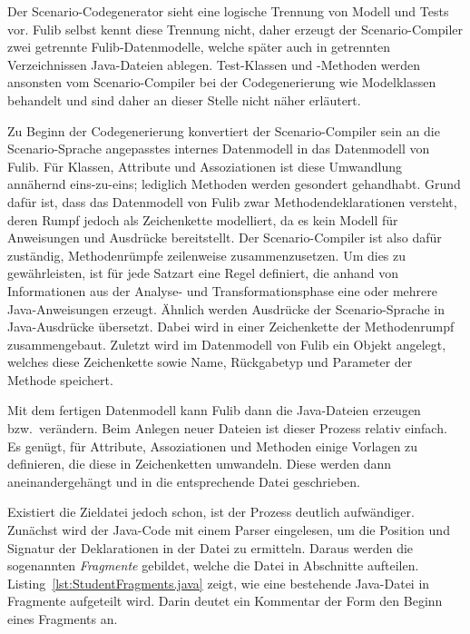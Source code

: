 Der Scenario-Codegenerator sieht eine logische Trennung von Modell und Tests vor.
Fulib selbst kennt diese Trennung nicht, daher erzeugt der Scenario-Compiler zwei getrennte Fulib-Datenmodelle, welche später auch in getrennten Verzeichnissen Java-Dateien ablegen.
Test-Klassen und -Methoden werden ansonsten vom Scenario-Compiler bei der Codegenerierung wie Modelklassen behandelt und sind daher an dieser Stelle nicht näher erläutert.

Zu Beginn der Codegenerierung konvertiert der Scenario-Compiler sein an die Scenario-Sprache angepasstes internes Datenmodell in das Datenmodell von Fulib.
Für Klassen, Attribute und Assoziationen ist diese Umwandlung annähernd eins-zu-eins;
lediglich Methoden werden gesondert gehandhabt.
Grund dafür ist, dass das Datenmodell von Fulib zwar Methodendeklarationen versteht,
deren Rumpf jedoch als Zeichenkette modelliert,
da es kein Modell für Anweisungen und Ausdrücke bereitstellt.
Der Scenario-Compiler ist also dafür zuständig, Methodenrümpfe zeilenweise zusammenzusetzen.
Um dies zu gewährleisten, ist für jede Satzart eine Regel definiert, die anhand von Informationen aus der Analyse- und Transformationsphase eine oder mehrere Java-Anweisungen erzeugt.
Ähnlich werden Ausdrücke der Scenario-Sprache in Java-Ausdrücke übersetzt.
Dabei wird in einer Zeichenkette der Methodenrumpf zusammengebaut.
Zuletzt wird im Datenmodell von Fulib ein Objekt angelegt, welches diese Zeichenkette sowie Name, Rückgabetyp und Parameter der Methode speichert.

Mit dem fertigen Datenmodell kann Fulib dann die Java-Dateien erzeugen bzw.\ verändern.
Beim Anlegen neuer Dateien ist dieser Prozess relativ einfach.
Es genügt, für Attribute, Assoziationen und Methoden einige Vorlagen zu definieren,
die diese in Zeichenketten umwandeln.
Diese werden dann aneinandergehängt und in die entsprechende Datei geschrieben.

Existiert die Zieldatei jedoch schon, ist der Prozess deutlich aufwändiger.
Zunächst wird der Java-Code mit einem Parser eingelesen, um die Position und Signatur der Deklarationen in der Datei zu ermitteln.
Daraus werden die sogenannten \emph{Fragmente} gebildet, welche die Datei in Abschnitte aufteilen.
Listing~\ref{lst:StudentFragments.java} zeigt, wie eine bestehende Java-Datei in Fragmente aufgeteilt wird.
Darin deutet ein Kommentar der Form  den Beginn eines Fragments an.

